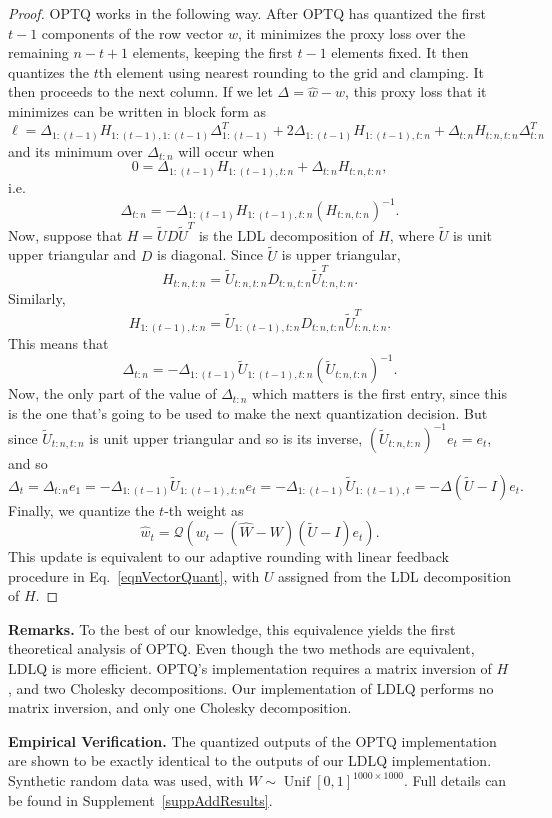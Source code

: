 \begin{proof}
OPTQ works in the following way. After OPTQ has quantized the first $t-1$ components of the row vector $w$, it minimizes the proxy loss over the remaining $n-t+1$ elements, keeping the first $t-1$ elements fixed. It then quantizes the $t$th element using nearest rounding to the grid and clamping. It then proceeds to the next column. If we let $\Delta = \hat w - w$, this proxy loss that it minimizes can be written in block form as $$
\ell = \Delta_{1:(t-1)} H_{1:(t-1),1:(t-1)} \Delta_{1:(t-1)}^T + 2 \Delta_{1:(t-1)} H_{1:(t-1),t:n} + \Delta_{t:n} H_{t:n,t:n} \Delta_{t:n}^T
$$
and its minimum over $\Delta_{t:n}$ will occur when $$ 0 = \Delta_{1:(t-1)} H_{1:(t-1),t:n} + \Delta_{t:n} H_{t:n,t:n}, $$ i.e. $$
\Delta_{t:n} = -\Delta_{1:(t-1)} H_{1:(t-1),t:n} \left( H_{t:n,t:n} \right)^{-1}.
$$
Now, suppose that $H = \tilde U D \tilde U^T$ is the LDL decomposition of $H$, where $\tilde U$ is unit upper triangular and $D$ is diagonal. Since $\tilde U$ is upper triangular, $$ H_{t:n,t:n} = \tilde U_{t:n,t:n} D_{t:n,t:n} \tilde U_{t:n,t:n}^T. $$ Similarly, $$ H_{1:(t-1),t:n} = \tilde U_{1:(t-1),t:n} D_{t:n,t:n} \tilde U_{t:n,t:n}^T. $$ This means that $$
\Delta_{t:n} = -\Delta_{1:(t-1)} \tilde U_{1:(t-1),t:n} \left( \tilde U_{t:n,t:n} \right)^{-1}.
$$
Now, the only part of the value of $\Delta_{t:n}$ which matters is the first entry, since this is the one that's going to be used to make the next quantization decision. But since $\tilde U_{t:n,t:n}$ is unit upper triangular and so is its inverse, $\left( \tilde U_{t:n,t:n} \right)^{-1} e_t = e_t$, and so $$
\Delta_t = \Delta_{t:n} e_1 = -\Delta_{1:(t-1)} \tilde U_{1:(t-1),t:n} e_t = -\Delta_{1:(t-1)} \tilde U_{1:(t-1),t} = -\Delta (\tilde U - I) e_t. $$ Finally, we quantize the $t$-th weight as
\[
    \hat w_t =
    \mathcal{Q}( w_t - (\hat W - W) (\tilde U - I) e_t ).
\]
This update is equivalent to our adaptive rounding with linear feedback procedure in Eq.~\eqref{eqnVectorQuant}, with $U$ assigned from the LDL decomposition of $H$.
\end{proof}

\textbf{Remarks.}
To the best of our knowledge, this equivalence yields the first theoretical analysis of OPTQ. Even though the two methods are equivalent, LDLQ is more efficient. OPTQ's implementation requires a matrix inversion of $H$, and two Cholesky decompositions. Our implementation of LDLQ performs no matrix inversion, and only one Cholesky decomposition.

\textbf{Empirical Verification.} The quantized outputs of the OPTQ implementation~\cite{frantar2023gptq} are shown to be exactly identical to the outputs of our LDLQ implementation. Synthetic random data was used, with $W \sim \operatorname{Unif}[0,1]^{1000 \times 1000}$. Full details can be found in Supplement~\ref{suppAddResults}.

